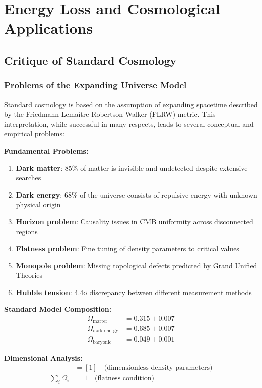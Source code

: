 \documentclass[12pt,a4paper]{report}
\begin{document}
	\chapter{Energy Loss and Cosmological Applications}
	\label{chap:cosmology}
	
	\section{Critique of Standard Cosmology}
	\label{sec:critique_standard_cosmology}
	
	\subsection{Problems of the Expanding Universe Model}
	\label{subsec:problems_space_expansion}
	
	Standard cosmology is based on the assumption of expanding spacetime described by the Friedmann-Lemaître-Robertson-Walker (FLRW) metric. This interpretation, while successful in many respects, leads to several conceptual and empirical problems:
	
	\textbf{Fundamental Problems:}
	\begin{enumerate}
		\item \textbf{Dark matter}: 85\% of matter is invisible and undetected despite extensive searches
		\item \textbf{Dark energy}: 68\% of the universe consists of repulsive energy with unknown physical origin
		\item \textbf{Horizon problem}: Causality issues in CMB uniformity across disconnected regions
		\item \textbf{Flatness problem}: Fine tuning of density parameters to critical values
		\item \textbf{Monopole problem}: Missing topological defects predicted by Grand Unified Theories
		\item \textbf{Hubble tension}: 4.4σ discrepancy between different measurement methods
	\end{enumerate}
	
	\textbf{Standard Model Composition:}
	\begin{align}
		\Omega_{\text{matter}} &= 0.315 \pm 0.007 \\
		\Omega_{\text{dark energy}} &= 0.685 \pm 0.007 \\
		\Omega_{\text{baryonic}} &= 0.049 \pm 0.001
	\end{align}
	
	\textbf{Dimensional Analysis:}
	\begin{align}
		[\Omega_i] &= [1] \quad \text{(dimensionless density parameters)} \\
		\sum_i \Omega_i &= 1 \quad \text{(flatness condition)}
	\end{align}
	
\end{document}
